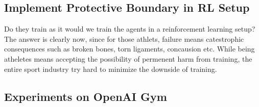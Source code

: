 \documentclass[journal]{IEEEtran}
\begin{document}
\subsection{Implement Protective Boundary in RL Setup}



Do they train as it would we train the agents in a reinforcement learning setup? The answer is clearly now, since for those athlets, failure means catestrophic consequences such as broken bones, torn ligaments, concausion etc. While being atheletes means accepting the possibility of permenent harm from training, the entire sport industry try hard to minimize the downside of training.


\subsection{Experiments on OpenAI Gym}
\end{document}
